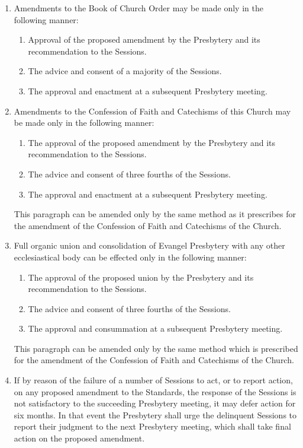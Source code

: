 \documentclass[
]{book}
\providecommand{\tightlist}{%
  \setlength{\itemsep}{0pt}\setlength{\parskip}{0pt}}
\begin{document}
\begin{enumerate}
\def\labelenumi{\arabic{enumi}.}
\setcounter{enumi}{1}
\item
  Amendments to the Book of Church Order may be made only in the following manner:

  \begin{enumerate}
  \def\labelenumii{\alph{enumii}.}
  \tightlist
  \item
    Approval of the proposed amendment by the Presbytery and its recommendation to the Sessions.
  \item
    The advice and consent of a majority of the Sessions.
  \item
    The approval and enactment at a subsequent Presbytery meeting.
  \end{enumerate}
\item
  Amendments to the Confession of Faith and Catechisms of this Church may be made only in the following manner:

  \begin{enumerate}
  \def\labelenumii{\alph{enumii}.}
  \tightlist
  \item
    The approval of the proposed amendment by the Presbytery and its recommendation to the Sessions.
  \item
    The advice and consent of three fourths of the Sessions.
  \item
    The approval and enactment at a subsequent Presbytery meeting.
  \end{enumerate}

  This paragraph can be amended only by the same method as it prescribes for the amendment of the Confession of Faith and Catechisms of the Church.
\item
  Full organic union and consolidation of Evangel Presbytery with any other ecclesiastical body can be effected only in the following manner:

  \begin{enumerate}
  \def\labelenumii{\alph{enumii}.}
  \tightlist
  \item
    The approval of the proposed union by the Presbytery and its recommendation to the Sessions.
  \item
    The advice and consent of three fourths of the Sessions.
  \item
    The approval and consummation at a subsequent Presbytery meeting.
  \end{enumerate}

  This paragraph can be amended only by the same method which is prescribed for the amendment of the Confession of Faith and Catechisms of the Church.
\item
  If by reason of the failure of a number of Sessions to act, or to report action, on any proposed amendment to the Standards, the response of the Sessions is not satisfactory to the succeeding Presbytery meeting, it may defer action for six months. In that event the Presbytery shall urge the delinquent Sessions to report their judgment to the next Presbytery meeting, which shall take final action on the proposed amendment.
\end{enumerate}
\end{document}
